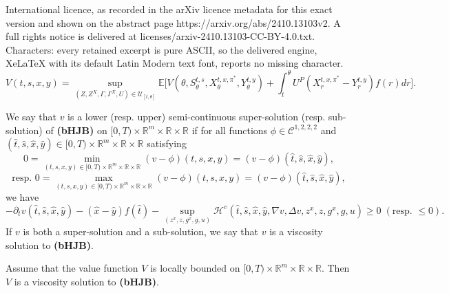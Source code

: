 \documentclass[10pt,a4paper]{amsart}
\newcommand{\E}{\mathbb{E}}
\begin{document}
International licence, as recorded in the arXiv licence metadata for this exact version and shown on the abstract page https://arxiv.org/abs/2410.13103v2. A full rights notice is delivered at licenses/arxiv-2410.13103-CC-BY-4.0.txt. Characters: every retained excerpt is pure ASCII, so the delivered engine, XeLaTeX with its default Latin Modern text font, reports no missing character.
\begin{equation}\label{DPP}
  V(t,s,x,y)= \sup_{(Z,Z^X,\Gamma,\Gamma^X,U)\in \mathcal U_{[t,\theta]}} \E\bigl[ V(\theta, S_\theta^{t,s},X_\theta^{t,x,\pi^*},Y_\theta^{t,y}) + \int_{t}^\theta U^P(X^{t,x,\pi^*}_r - {Y}^{t,y}_r) f(r)dr \bigl].
\end{equation}

\begin{definition}\label{viscosity:def} We say that $v$ is a lower (resp. upper) semi-continuous super-solution (resp. sub-solution) of \textbf{(bHJB)} on $[0,T)\times \mathbb R^m\times \mathbb R\times \mathbb R$ if for all functions $\phi\in \mathcal C^{1,2,2,2}$ and $(\hat t,\hat s,\hat x,\hat y)\in[0,T)\times \mathbb R^m\times \mathbb R\times \mathbb R$ satisfying 
\[0=\min_{(t,s,x,y)\in [0,T)\times \mathbb R^m\times \mathbb R\times \mathbb R} (v-\phi)(t,s,x,y)=(v-\phi)(\hat t,\hat s,\hat x,\hat y),\]
\[\text{resp. } 0=\max_{(t,s,x,y)\in [0,T)\times \mathbb R^m\times \mathbb R\times \mathbb R} (v-\phi)(t,s,x,y)=(v-\phi)(\hat t,\hat s,\hat x,\hat y),\]
    we have
    \[-\partial_t v(\hat t,\hat s,\hat x,\hat y) - (\hat x - \hat y) f(\hat t) -\sup_{(z^x, z, g^x, g, u)}    \mathcal H^v(\hat t,\hat s,\hat x,\hat y, \nabla v, \Delta v, z^x, z, g^x, g, u) \geq 0\; (\text{resp. }\leq 0).\]
    If $v$ is both a super-solution and a sub-solution, we say that $v$ is a viscosity solution to \textbf{(bHJB)}.
\end{definition}

\begin{theorem}\label{thm:visco}
    Assume that the value function $V$ is locally bounded on $[0,T)\times \mathbb R^m\times\mathbb R\times \mathbb R$. Then $V$ is a viscosity solution to \textbf{(bHJB)}.
\end{theorem}
\end{document}
